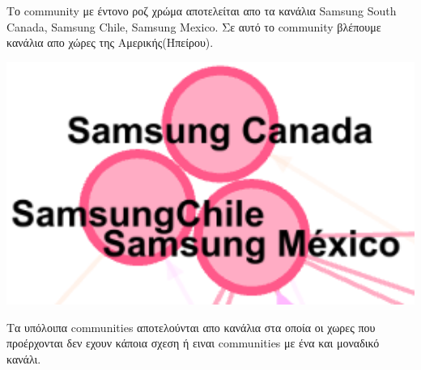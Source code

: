 \documentclass[12pt]{article}
\begin{document}
	\vspace{12pt}
	\vspace{12pt}
	\vspace{12pt}
	\begin{minipage}{0.6\textwidth}
		Το community με έντονο ροζ χρώμα αποτελείται απο τα κανάλια Samsung South Canada, Samsung Chile, Samsung Mexico. Σε αυτό το community βλέπουμε κανάλια απο χώρες της Αμερικής(Ηπείρου).
	\end{minipage}
	\hspace{0.05\textwidth}
	\begin{minipage}{0.3\textwidth}
		\includegraphics[width=1.0\textwidth]{photos-files/section12/0.1/ameriki_ipiros.png}
	\end{minipage}
	
	\vspace{12pt}
	\vspace{12pt}
	\vspace{12pt}
	Τα υπόλοιπα communities αποτελούνται απο κανάλια στα οποία οι χωρες που προέρχονται δεν εχουν κάποια σχεση ή ειναι communities με ένα και μοναδικό κανάλι.

	
\end{document}
